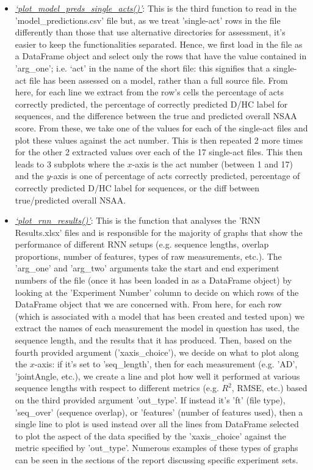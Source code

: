 \documentclass[12pt,twoside]{report}
\begin{document}
\begin{itemize}
	\item \underline{\textit{‘plot\_model\_preds\_single\_acts()’}}: This is the third function to read in the 'model\_predictions.csv' file but, as we treat 'single-act' rows in the file differently than those that use alternative directories for assessment, it's easier to keep the functionalities separated. Hence, we first load in the file as a DataFrame object and select only the rows that have the value contained in 'arg\_one’; i.e. ‘act’ in the name of the short file: this signifies that a single-act file has been assessed on a model, rather than a full source file. From here, for each line we extract from the row's cells the percentage of acts correctly predicted, the percentage of correctly predicted D/HC label for sequences, and the difference between the true and predicted overall NSAA score. From these, we take one of the values for each of the single-act files and plot these values against the act number. This is then repeated 2 more times for the other 2 extracted values over each of the 17 single-act files. This then leads to 3 subplots where the $x$-axis is the act number (between 1 and 17) and the $y$-axis is one of percentage of acts correctly predicted, percentage of correctly predicted D/HC label for sequences, or the diff between true/predicted overall NSAA.
	\item \underline{\textit{‘plot\_rnn\_results()’}}: This is the function that analyses the 'RNN Results.xlsx' files and is responsible for the majority of graphs that show the performance of different RNN setups (e.g. sequence lengths, overlap proportions, number of features, types of raw measurements, etc.). The 'arg\_one' and 'arg\_two' arguments take the start and end experiment numbers of the file (once it has been loaded in as a DataFrame object) by looking at the 'Experiment Number' column to decide on which rows of the DataFrame object that we are concerned with. From here, for each row (which is associated with a model that has been created and tested upon) we extract the names of each measurement the model in question has used, the sequence length, and the results that it has produced. Then, based on the fourth provided argument ('xaxis\_choice'), we decide on what to plot along the $x$-axis: if it's set to 'seq\_length', then for each measurement (e.g. 'AD', 'jointAngle, etc.), we create a line and plot how well it performed at various sequence lengths with respect to different metrics (e.g. $R^2$, RMSE, etc.) based on the third provided argument 'out\_type'. If instead it's 'ft' (file type), 'seq\_over' (sequence overlap), or 'features' (number of features used), then a single line to plot is used instead over all the lines from DataFrame selected to plot the aspect of the data specified by the 'xaxis\_choice' against the metric specified by 'out\_type'. Numerous examples of these types of graphs can be seen in the sections of the report discussing specific experiment sets.
\end{itemize}
\end{document}
